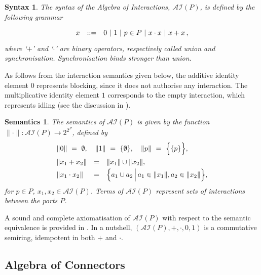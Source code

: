 \documentclass{llncs}
\newtheorem*{syntax}{Syntax}
\newtheorem*{semantics}{Semantics}
\newcommand{\ai}{\ensuremath{\mathcal{AI}}}
\begin{document}
\begin{syntax}
The syntax of the {\em Algebra of Interactions}, $\ai(P)$, is defined by
the following grammar
%
\begin{equation} \label{eq:apsynt}
  \begin{array}{rc*{4}{l@{\ |\ }}l}
    x & ::= & 0 & 1 & p \in P & x\cdot x & x + x \,,\\
  \end{array}
\end{equation}
%
where `$+$' and `$\cdot$' are binary operators, respectively called
{\em union} and {\em synchronisation}.  Synchronisation binds stronger
than union.
\end{syntax}
%
As follows from the interaction semantics given below, the additive
identity element $0$ represents blocking, since it does not authorise
any interaction.  The multiplicative identity element $1$ corresponds
to the empty interaction, which represents idling (see the discussion
in \cite{BarBliu15-offer-scico}).

\begin{semantics}
The semantics of $\ai(P)$ is given by the function $\|\cdot\| : \ai(P)
\rightarrow 2^{2^P}$, defined by
%
\begin{equation} \label{eq:apsem}
  \renewcommand{\arraystretch}{1.5}
  \begin{array}{lcl}
    \lefteqn{\|0\|\ =\ \emptyset,\quad \|1\|\ =\ \{\emptyset\},\quad
      \|p\|\ =\ \Big\{\{p\}\Big\},}\\
    \|x_1 + x_2\| &=& \|x_1\| \cup \|x_2\|,\\
    \|x_1 \cdot x_2\| &=& 
    \Big\{a_1 \cup a_2\,\Big|\, a_1\in \|x_1\|, a_2\in \|x_2\| \Big\},
  \end{array}
\end{equation}
for $p\in P$, $x_1,x_2\in\ai(P)$.  Terms of $\ai(P)$ represent sets of
interactions between the ports $P$.
\end{semantics}

A sound and complete axiomatisation of $\ai(P)$ with respect to the
semantic equivalence is provided in \cite{BliSif07-acp-emsoft}.  In a
nutshell, $(\ai(P), +, \cdot, 0, 1)$ is a commutative semiring,
idempotent in both $+$ and $\cdot$.



\subsection{Algebra of Connectors}
\label{secn:ac}
\end{document}
